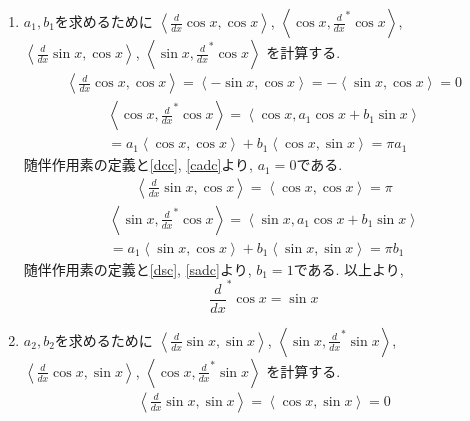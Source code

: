 \documentclass[a4paper,11pt]{jsarticle}
\begin{document}
\begin{enumerate}
  \renewcommand{\labelenumi}{(\roman{enumi})}
  \item $a_1, b_1$を求めるために 
    $\left<\frac{d}{dx}\cos{x}, \cos{x}\right>$,
    $\left<\cos{x}, \frac{d}{dx}^*\cos{x}\right>$,
    $\left<\frac{d}{dx}\sin{x}, \cos{x}\right>$,
    $\left<\sin{x}, \frac{d}{dx}^*\cos{x}\right>$
    を計算する.
    \begin{eqnarray}
      \left<\frac{d}{dx}\cos{x}, \cos{x}\right>
      = \left<-\sin{x}, \cos{x}\right>
      = -\left<\sin{x}, \cos{x}\right>
      = 0 \label{dcc}
    \end{eqnarray}
    \begin{equation}
      \begin{split}
        \left<\cos{x}, \frac{d}{dx}^*\cos{x}\right>
        = \left<\cos{x}, a_1\cos{x} + b_1\sin{x}\right> \\
        = a_1\left<\cos{x}, \cos{x}\right> + b_1\left<\cos{x}, \sin{x}\right>
        = \pi a_1
      \end{split}
      \label{cadc}
    \end{equation}
    随伴作用素の定義と\eqref{dcc}, \eqref{cadc}より, $a_1=0$である.
    \begin{eqnarray}
      \left<\frac{d}{dx}\sin{x}, \cos{x}\right>
      = \left<\cos{x}, \cos{x}\right>
      = \pi \label{dsc}
    \end{eqnarray}
    \begin{equation}
      \begin{split}
        \left<\sin{x}, \frac{d}{dx}^*\cos{x}\right>
        = \left<\sin{x}, a_1\cos{x} + b_1\sin{x}\right> \\
        = a_1\left<\sin{x}, \cos{x}\right> + b_1\left<\sin{x}, \sin{x}\right>
        = \pi b_1
      \end{split}
      \label{sadc}
    \end{equation}
    随伴作用素の定義と\eqref{dsc}, \eqref{sadc}より, $b_1=1$である.
    以上より, 
    \[
      \frac{d}{dx}^*\cos{x} = \sin{x}
    \]
  \item $a_2, b_2$を求めるために 
    $\left<\frac{d}{dx}\sin{x}, \sin{x}\right>$,
    $\left<\sin{x}, \frac{d}{dx}^*\sin{x}\right>$,
    $\left<\frac{d}{dx}\cos{x}, \sin{x}\right>$,
    $\left<\cos{x}, \frac{d}{dx}^*\sin{x}\right>$
    を計算する.
    \begin{eqnarray}
      \left<\frac{d}{dx}\sin{x}, \sin{x}\right>
      = \left<\cos{x}, \sin{x}\right>
      = 0 \label{dss}
    \end{eqnarray}

\end{enumerate}
\end{document}
